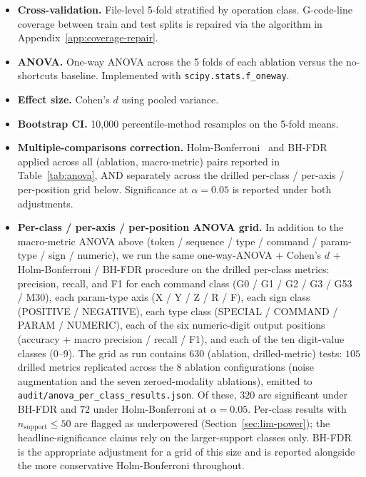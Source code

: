 \begin{itemize}
\item \textbf{Cross-validation.} File-level 5-fold stratified by operation
class. G-code-line coverage between train and test splits is repaired via
the algorithm in Appendix~\ref{app:coverage-repair}.
\item \textbf{ANOVA.} One-way ANOVA across the 5 folds of each ablation
versus the no-shortcuts baseline. Implemented with
\texttt{scipy.stats.f\_oneway}.
\item \textbf{Effect size.} Cohen's $d$ using pooled variance.
\item \textbf{Bootstrap CI.} 10{,}000 percentile-method resamples on the
5-fold means.
\item \textbf{Multiple-comparisons correction.} Holm-Bonferroni~\cite{holm1979simple} and BH-FDR~\cite{benjamini1995controlling}
applied across all (ablation, macro-metric) pairs reported in
Table~\ref{tab:anova}, AND separately across the drilled per-class /
per-axis / per-position grid below. Significance at $\alpha=0.05$ is
reported under both adjustments.

\item \textbf{Per-class / per-axis / per-position ANOVA grid.} In
addition to the macro-metric ANOVA above (token / sequence / type /
command / param-type / sign / numeric), we run the same one-way-ANOVA +
Cohen's $d$ + Holm-Bonferroni / BH-FDR procedure on the drilled
per-class metrics: precision, recall, and F1 for each command class
(G0 / G1 / G2 / G3 / G53 / M30), each param-type axis (X / Y / Z / R /
F), each sign class (POSITIVE / NEGATIVE), each type class (SPECIAL /
COMMAND / PARAM / NUMERIC), each of the six numeric-digit output
positions (accuracy + macro precision / recall / F1), and each of the
ten digit-value classes (0--9). The grid as run contains $630$
(ablation, drilled-metric) tests: $105$ drilled metrics replicated
across the $8$ ablation configurations (noise augmentation and the
seven zeroed-modality ablations), emitted to
\texttt{audit/\allowbreak anova\_per\_class\_results.json}. Of these, $320$ are
significant under BH-FDR and $72$ under Holm-Bonferroni at
$\alpha=0.05$. Per-class results with $n_{\text{support}} \le 50$ are
flagged as underpowered (Section~\ref{sec:lim-power}); the
headline-significance claims rely on the larger-support classes only.
BH-FDR is the appropriate adjustment for a grid of this size and is
reported alongside the more conservative Holm-Bonferroni throughout.
\end{itemize}

